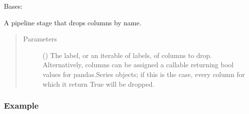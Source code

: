 \documentclass[letterpaper,10pt,english]{sphinxmanual}
\begin{document}
\begin{fulllineitems}
\label{\detokenize{dalio.pipe:dalio.pipe.select.ColDrop}}
Bases: 

A pipeline stage that drops columns by name.
\begin{quote}\begin{description}
\item[{Parameters}] \leavevmode
{} (\sphinxstyleliteralemphasis{\sphinxupquote{, }}) \textendash{} The label, or an iterable of labels, of columns to drop. Alternatively,
columns can be assigned a callable returning bool values for
pandas.Series objects; if this is the case, every column for which it
return True will be dropped.

\end{description}\end{quote}
\subsubsection*{Example}

\begin{sphinxVerbatim}[commandchars=\\\{\}]
       
  \PYG{p}{[}\PYG{p}{[}\PYG{p}{]}\PYG{p}{[}\PYG{p}{]}\PYG{p}{]} \PYG{p}{[}\PYG{p}{]} \PYG{p}{[} \PYG{p}{]}
\end{sphinxVerbatim}


\end{fulllineitems}
\end{document}
